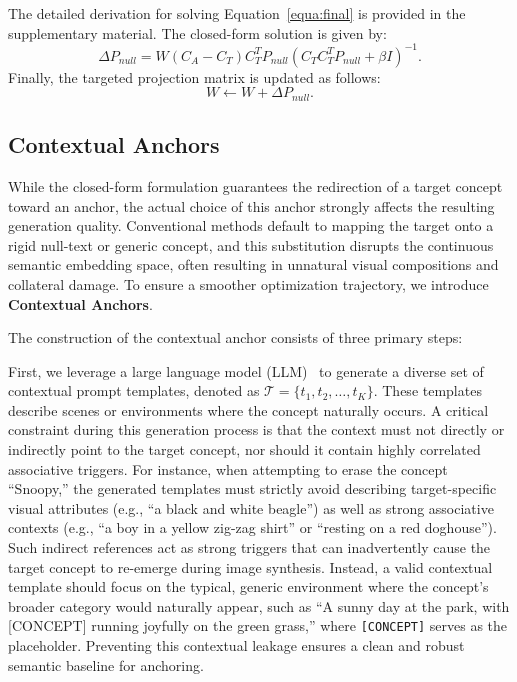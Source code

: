 \documentclass[letterpaper]{article} %
\begin{document}
The detailed derivation for solving Equation~\eqref{equa:final} is provided in the supplementary material. The closed-form solution is given by:
\begin{equation}\label{delta_P_null}
    \Delta P_{null} = W(C_A - C_T) C_T^T P_{null} (C_T C_T^T P_{null} + \beta I)^{-1} .
\end{equation}
Finally, the targeted projection matrix is updated as follows:
\begin{equation}
    W \leftarrow W + \Delta P_{null} .
\end{equation}



\subsection{Contextual Anchors}

While the closed-form formulation guarantees the redirection of a target concept toward an anchor, the actual choice of this anchor strongly affects the resulting generation quality. Conventional methods default to mapping the target onto a rigid null-text or generic concept, and this substitution disrupts the continuous semantic embedding space, often resulting in unnatural visual compositions and collateral damage. To ensure a smoother optimization trajectory, we introduce \textbf{Contextual Anchors}.

The construction of the contextual anchor consists of three primary steps:

First, we leverage a large language model (LLM)~\cite{LLM} to generate a diverse set of contextual prompt templates, denoted as $\mathcal{T} = \{t_1, t_2, \dots, t_K\}$. These templates describe scenes or environments where the concept naturally occurs. A critical constraint during this generation process is that the context must not directly or indirectly point to the target concept, nor should it contain highly correlated associative triggers. For instance, when attempting to erase the concept ``Snoopy,'' the generated templates must strictly avoid describing target-specific visual attributes (e.g., ``a black and white beagle'') as well as strong associative contexts (e.g., ``a boy in a yellow zig-zag shirt'' or ``resting on a red doghouse''). Such indirect references act as strong triggers that can inadvertently cause the target concept to re-emerge during image synthesis. Instead, a valid contextual template should focus on the typical, generic environment where the concept's broader category would naturally appear, such as ``A sunny day at the park, with [CONCEPT] running joyfully on the green grass,'' where \texttt{[CONCEPT]} serves as the placeholder. Preventing this contextual leakage ensures a clean and robust semantic baseline for anchoring.
\end{document}
